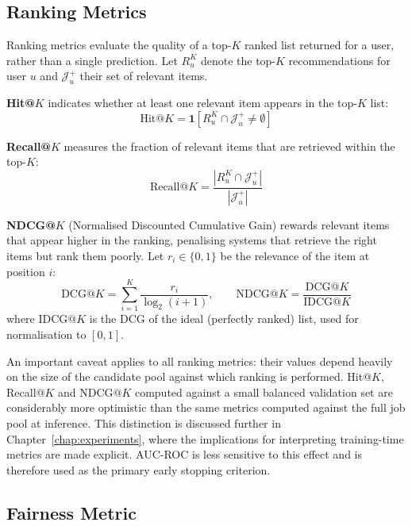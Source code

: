 \subsection{Ranking Metrics}
\label{sec:prelim_ranking}

Ranking metrics evaluate the quality of a top-$K$ ranked list returned for a user, rather than a single prediction. Let $R_u^K$ denote the top-$K$ recommendations for user $u$ and $\mathcal{J}^{+}_u$ their set of relevant items.

\textbf{Hit@$K$} indicates whether at least one relevant item appears in the top-$K$ list:
\begin{equation}
    \text{Hit@}K = \mathbf{1}\left[ R_u^K \cap \mathcal{J}^{+}_u \neq \emptyset \right]
\end{equation}

\textbf{Recall@$K$} measures the fraction of relevant items that are retrieved within the top-$K$:
\begin{equation}
    \text{Recall@}K = \frac{|R_u^K \cap \mathcal{J}^{+}_u|}{|\mathcal{J}^{+}_u|}
\end{equation}

\textbf{NDCG@$K$} (Normalised Discounted Cumulative Gain) rewards relevant items that appear higher in the ranking, penalising systems that retrieve the right items but rank them poorly. Let $r_i \in \{0,1\}$ be the relevance of the item at position $i$:
\begin{equation}
    \text{DCG@}K = \sum_{i=1}^{K} \frac{r_i}{\log_2(i+1)}, \qquad
    \text{NDCG@}K = \frac{\text{DCG@}K}{\text{IDCG@}K}
\end{equation}
where IDCG@$K$ is the DCG of the ideal (perfectly ranked) list, used for normalisation to $[0,1]$.

An important caveat applies to all ranking metrics: their values depend heavily on the size of the candidate pool against which ranking is performed. Hit@$K$, Recall@$K$ and NDCG@$K$ computed against a small balanced validation set are considerably more optimistic than the same metrics computed against the full job pool at inference. This distinction is discussed further in Chapter~\ref{chap:experiments}, where the implications for interpreting training-time metrics are made explicit. AUC-ROC is less sensitive to this effect and is therefore used as the primary early stopping criterion.

\subsection{Fairness Metric}
\label{sec:prelim_fairness}

